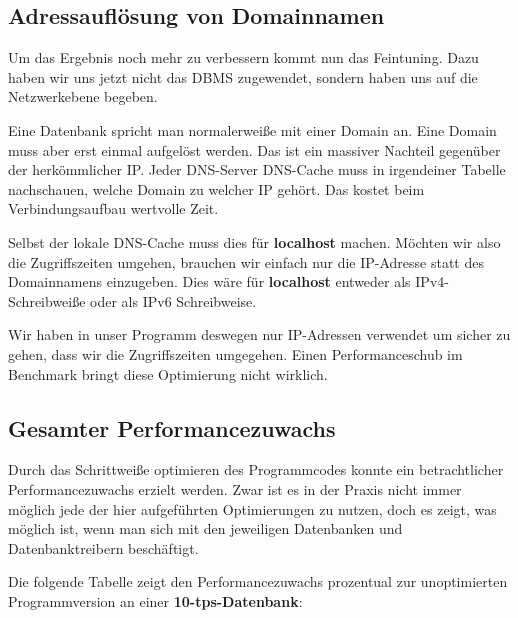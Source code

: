 \subsection{Adressauflösung von Domainnamen}
Um das Ergebnis noch mehr zu verbessern kommt nun das Feintuning. Dazu
haben wir uns jetzt nicht das DBMS zugewendet, sondern haben uns auf die
Netzwerkebene begeben.

Eine Datenbank spricht man normalerweiße mit einer Domain an. 
Eine Domain muss aber erst einmal aufgelöst werden.
Das ist ein massiver Nachteil gegenüber der herkömmlicher IP. Jeder
DNS-Server \bzw DNS-Cache muss in irgendeiner Tabelle nachschauen, welche Domain
zu welcher IP gehört. Das kostet beim Verbindungsaufbau wertvolle Zeit.

Selbst der lokale DNS-Cache muss dies \zB für \textbf{localhost} machen.
Möchten wir also die Zugriffszeiten umgehen, brauchen wir einfach nur die IP-Adresse
statt des Domainnamens einzugeben. Dies wäre für \textbf{localhost} entweder  als
IPv4-Schreibweiße oder \gqq{[::1]} als IPv6 Schreibweise.

Wir haben in unser Programm deswegen nur IP-Adressen verwendet um sicher zu gehen, dass wir 
die Zugriffszeiten umgegehen. Einen Performanceschub im
Benchmark bringt diese Optimierung nicht wirklich.

\subsection{Gesamter Performancezuwachs}
Durch das Schrittweiße optimieren des Programmcodes konnte ein betrachtlicher
Performancezuwachs erzielt werden. Zwar ist es in der Praxis nicht immer möglich
jede der hier aufgeführten Optimierungen zu nutzen, doch es zeigt, was möglich
ist, wenn man sich mit den jeweiligen Datenbanken und Datenbanktreibern beschäftigt.

Die folgende Tabelle zeigt den Performancezuwachs prozentual zur unoptimierten
Programmversion an einer \textbf{10-tps-Datenbank}: 



\clearpage